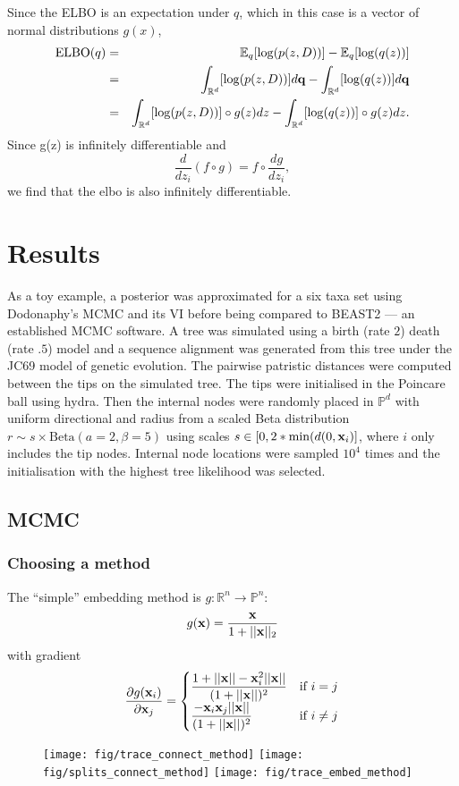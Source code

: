 \documentclass[11pt]{article}
\newcommand{\be}{\begin{equation*}}
\newcommand{\ee}{\end{equation*}}
\newcommand{\bee}{\begin{eqnarray*}}
\newcommand{\eee}{\end{eqnarray*}}
\begin{document}
Since the ELBO is an expectation under $q$, which in this case is a vector of normal distributions $g(x)$,
\bee
\text{ELBO}(q) &=& \mathbb{E}_{q}[\log(p(z,D))] - \mathbb{E}_{q}[\log(q(z))]\\
&=& \int_{\mathbb{R}^{d}}[\log(p(z,D))] d\bold{q} - \int_{\mathbb{R}^{d}}[\log(q(z))] d\bold{q}\\
&=& \int_{\mathbb{R}^{d}}[\log(p(z,D))] \circ g(z) dz - \int_{\mathbb{R}^{d}}[\log(q(z))] \circ g(z) dz.
\eee
Since g(z) is infinitely differentiable and
\be
\dfrac{d}{dz_{i}} (f \circ g) = f \circ \dfrac{dg}{dz_{i}},
\ee
we find that the elbo is also infinitely differentiable.



\section{Results}
As a toy example, a posterior was approximated for a six taxa set using Dodonaphy's MCMC and its VI before being compared to BEAST2 --- an established MCMC software.
A tree was simulated using a birth (rate $2$) death (rate $.5$) model and a sequence alignment was generated from this tree under the JC69 model of genetic evolution.
The pairwise patristic distances were computed between the tips on the simulated tree.
The tips were initialised in the Poincare ball using hydra.
Then the internal nodes were randomly placed in $\mathbb{P}^{d}$ with uniform directional and radius from a scaled Beta distribution $ r \sim s \times \text{Beta}(a=2, \beta=5)$ using scales $s \in [0, 2*\min(d(0, \bold{x}_{i})]$, where $i$ only includes the tip nodes.
Internal node locations were sampled $10^{4}$ times and the initialisation with the highest tree likelihood was selected.

\subsection{MCMC}

\subsubsection{Choosing a method}
The ``simple'' embedding method is $g: \mathbb{R}^{n} \to \mathbb{P}^{n}$:
\be
g(\bold{x}) = \dfrac{\bold{x}}{1+||\bold{x}||_{2}}
\ee
with gradient
\be
\dfrac{\partial g(\bold{x}_{i})}{\partial \bold{x}_{j}} = 
\begin{cases}
\dfrac{1+||\bold{x}||-\bold{x}_{i}^{2}||\bold{x}||}{(1+||\bold{x}||)^{2}} &\text{if } i=j\\
\dfrac{-\bold{x}_{i}\bold{x}_{j}||\bold{x}||}{(1+||\bold{x}||)^{2}} &\text{if } i\neq j\\
\end{cases}
\ee
\begin{figure}[htbp]
\begin{center}
\texttt{[image: fig/trace\_connect\_method]}%
\texttt{[image: fig/splits\_connect\_method]}
\texttt{[image: fig/trace\_embed\_method]}
\end{center}
\end{figure}
\end{document}
